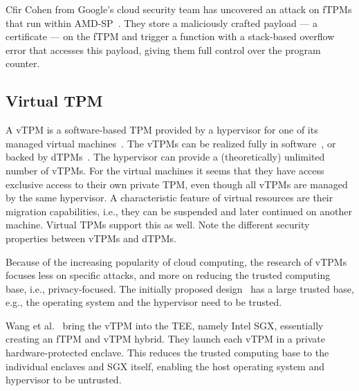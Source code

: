 Cfir Cohen from Google's cloud security team has uncovered an attack on fTPMs that run within AMD-SP~\cite{cohen}. They store a maliciously crafted payload --- a certificate --- on the fTPM and trigger a function with a stack-based overflow error that accesses this payload, giving them full control over the program counter.



\subsection{Virtual TPM}

A vTPM is a software-based TPM provided by a hypervisor for one of its managed virtual machines~\cite{268868}.
The vTPMs can be realized fully in software~\cite{268868}, or backed by dTPMs~\cite{Liu2010}.
The hypervisor can provide a (theoretically) unlimited number of vTPMs.
For the virtual machines it seems that they have access exclusive access to their own private TPM, even though all vTPMs are managed by the same hypervisor.
A characteristic feature of virtual resources are their migration capabilities, i.e., they can be suspended and later continued on another machine.
Virtual TPMs support this as well.
Note the different security properties between vTPMs and dTPMs.

Because of the increasing popularity of cloud computing, the research of vTPMs focuses less on specific attacks, and more on reducing the trusted computing base, i.e., privacy-focused. The initially proposed design~\cite{268868} has a large trusted base, e.g., the operating system and the hypervisor need to be trusted.

Wang et al.~\cite{Wang2019} bring the vTPM into the \ac{TEE}, namely Intel SGX, essentially creating an fTPM and vTPM hybrid. They launch each vTPM in a private hardware-protected enclave. This reduces the trusted computing base to the individual enclaves and SGX itself, enabling the host operating system and hypervisor to be untrusted.

